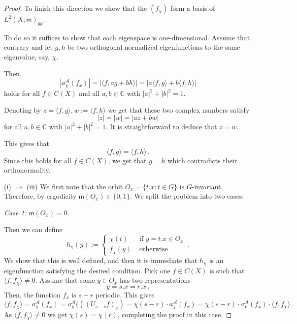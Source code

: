 \documentclass[10pt,a4paper]{amsart}
\newcommand{\CC}{{\mathbb C}}
\newcommand{\cA}{{\mathcal A}}
\newcommand{\mm}{\mathsf{m}}
\begin{document}
\begin{proof}
To finish this direction we show that the $(f_\chi)$ form a basis of $L^2 (X,\mm)_{\mathsf{pp}}$.

To do so it suffices to show that each eigenspace is one-dimensional. Assume that contrary and let $g,h$ be two orthogonal normalized  eigenfunctions to the same eigenvalue, say, $\chi$.

Then,
\[
|a_{\chi}^{\cA} (f_x)| = |\langle f, a g + b h\rangle| = |a \langle f,g\rangle + b \langle f,h\rangle|
\]
holds for all $f\in C(X)$ and all $a,b\in\CC$ with $|a|^2 + |b|^2 =1$.

Denoting by $z=  \langle f,g\rangle, w := \langle f,h\rangle$ we get that these two complex numbers satisfy
\[
|z|=|w|=|az+bw|
\]
for all $a,b \in \CC$ with $|a|^2+|b|^2=1$. It is straightforward to deduce that $z=w$.

This gives that
\[
\langle f,g\rangle = \langle f,h\rangle \,.
\]
Since this holds for all $f \in C(X)$, we get that $g=h$ which contradicts their orthonormality.




\smallskip


\noindent (i) $\Longrightarrow$ (iii) We first note  that the orbit $O_x=\{ t.x :t \in G\}$ is $G$-invariant. Therefore, by ergodicity $\mm(O_x) \in \{ 0,1 \}$. We split the problem into two cases:

{\it Case 1:} $\mm(O_x)=0$.

Then we can define
\[
h_\chi(y):=
\left\{
\begin{array}{cc}
  \chi(t) & \mbox{ if } y =t.x \in O_{x} \\
  f_\chi(y) &\mbox{ otherwise }
\end{array}
\right. \ .
\]
We show that this is well defined, and then it is immediate that $h_\chi$ is an eigenfunction satisfying the desired condition.
Pick one $f \in C(X)$ is such that $\langle f, f_\chi \rangle \neq 0$.
Assume that some $y \in O_{x}$ has two representations
\[
y=s.x = r.x \ .
\]
Then, the function $f_x$ is $s-r$ periodic. This gives
\[
\langle f, f_\chi \rangle = a_{\chi}^\cA(f_x)= a_{\chi}^\cA( ((U_{s-r} f)_x)= \overline{\chi(s-r)} \cdot a_{\chi}^\cA(f_x)= \overline{\chi(s-r)} \cdot a_{\chi}^\cA(f_x) \cdot \langle f, f_\chi \rangle \ .
\]
As $\langle f, f_\chi \rangle \neq 0$ we get $\chi(s)=\chi(r)$, completing the proof in this case.


\end{proof}
\end{document}

